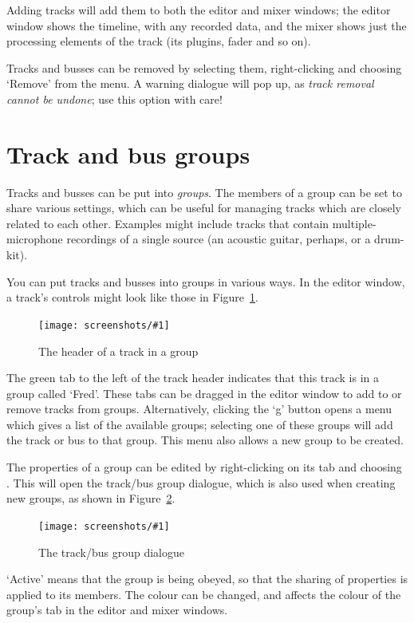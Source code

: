 \documentclass[10pt,a4paper]{book}
\newcommand{\menu}[1]{\emph{\StrSubstitute{#1}{,}{ $\rightarrow$ }}}
\newcommand{\screenshot}[3]{%
\begin{figure}[ht]%
\begin{center}
\texttt{[image: screenshots/\#1]}
\end{center}
\caption{#2}
\label{#3}
\end{figure}}
\begin{document}
{Adding tracks will add them to both the editor and mixer windows; the
editor window shows the timeline, with any recorded data, and the
mixer shows just the processing elements of the track (its plugins,
fader and so on).

Tracks and busses can be removed by selecting them, right-clicking and
choosing `Remove' from the menu.  A warning dialogue will pop up, as
\emph{track removal cannot be undone}; use this option with care!


\section{Track and bus groups}
\label{sec:track-and-bus-groups}

Tracks and busses can be put into \emph{groups}. The members of a
group can be set to share various settings, which can be useful for
managing tracks which are closely related to each other.  Examples
might include tracks that contain multiple-microphone recordings of a
single source (an acoustic guitar, perhaps, or a drum-kit).

You can put tracks and busses into groups in various ways.  In the
editor window, a track's controls might look like those in
Figure~\ref{fig:track-in-group}.

\screenshot{track-in-group.png}{The header of a track in a group}{fig:track-in-group}

The green tab to the left of the track header indicates that this
track is in a group called `Fred'.  These tabs can be dragged in the
editor window to add to or remove tracks from groups.  Alternatively,
clicking the `g' button opens a menu which gives a list of the
available groups; selecting one of these groups will add the track or
bus to that group.  This menu also allows a new group to be created.

The properties of a group can be edited by right-clicking on its tab
and choosing \menu{Edit Group...}.  This will open the track/bus group
dialogue, which is also used when creating new groups, as shown in
Figure~\ref{fig:route-group-dialogue}.

\screenshot{route-group-dialogue.png}{The track/bus group dialogue}{fig:route-group-dialogue}

`Active' means that the group is being obeyed, so that the sharing of
properties is applied to its members.  The colour can be changed, and
affects the colour of the group's tab in the editor and mixer windows.

}
\end{document}
